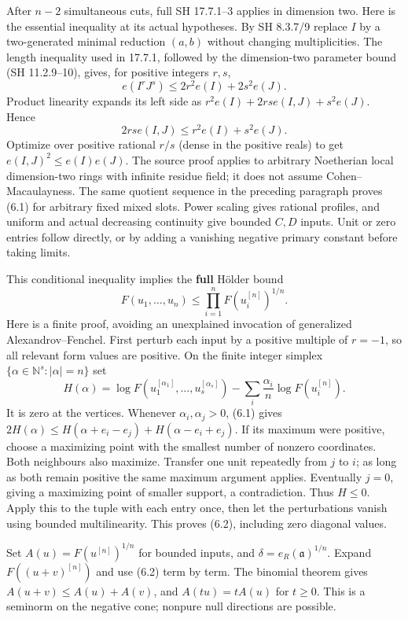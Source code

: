 \documentclass[
]{article}
\begin{document}
After \(n-2\) simultaneous cuts, full SH 17.7.1--3 applies in dimension
two. Here is the essential inequality at its actual hypotheses. By SH
8.3.7/9 replace \(I\) by a two-generated minimal reduction \((a,b)\)
without changing multiplicities. The length inequality used in 17.7.1,
followed by the dimension-two parameter bound (SH 11.2.9--10), gives,
for positive integers \(r,s\), \[e(I^rJ^s)\le2r^2e(I)+2s^2e(J).\]
Product linearity expands its left side as
\(r^2e(I)+2rs e(I,J)+s^2e(J)\). Hence \[2rs e(I,J)\le r^2e(I)+s^2e(J).\]
Optimize over positive rational \(r/s\) (dense in the positive reals) to
get \(e(I,J)^2\le e(I)e(J)\). The source proof applies to arbitrary
Noetherian local dimension-two rings with infinite residue field; it
does not assume Cohen--Macaulayness. The same quotient sequence in the
preceding paragraph proves (6.1) for arbitrary fixed mixed slots. Power
scaling gives rational profiles, and uniform and actual decreasing
continuity give bounded \(C,D\) inputs. Unit or zero entries follow
directly, or by adding a vanishing negative primary constant before
taking limits.

This conditional inequality implies the \textbf{full} Hölder bound
\[F(u_1,\ldots,u_n)\le\prod_{i=1}^n F(u_i^{[n]})^{1/n}.\tag{6.2}\] Here
is a finite proof, avoiding an unexplained invocation of generalized
Alexandrov--Fenchel. First perturb each input by a positive multiple of
\(r=-1\), so all relevant form values are positive. On the finite
integer simplex \(\{\alpha\in\mathbb N^s:|\alpha|=n\}\) set
\[H(\alpha)=\log F(u_1^{[\alpha_1]},\ldots,u_s^{[\alpha_s]})-\sum_i\frac{\alpha_i}{n}\log F(u_i^{[n]}).\]
It is zero at the vertices. Whenever \(\alpha_i,\alpha_j>0\), (6.1)
gives \(2H(\alpha)\le H(\alpha+e_i-e_j)+H(\alpha-e_i+e_j)\). If its
maximum were positive, choose a maximizing point with the smallest
number of nonzero coordinates. Both neighbours also maximize. Transfer
one unit repeatedly from \(j\) to \(i\); as long as both remain positive
the same maximum argument applies. Eventually \(j=0\), giving a
maximizing point of smaller support, a contradiction. Thus \(H\le0\).
Apply this to the tuple with each entry once, then let the perturbations
vanish using bounded multilinearity. This proves (6.2), including zero
diagonal values.

Set \(A(u)=F(u^{[n]})^{1/n}\) for bounded inputs, and
\(\delta=e_R(\mathfrak a)^{1/n}\). Expand \(F((u+v)^{[n]})\) and use
(6.2) term by term. The binomial theorem gives \(A(u+v)\le A(u)+A(v)\),
and \(A(tu)=tA(u)\) for \(t\ge0\). This is a seminorm on the negative
cone; nonpure null directions are possible.
\end{document}

